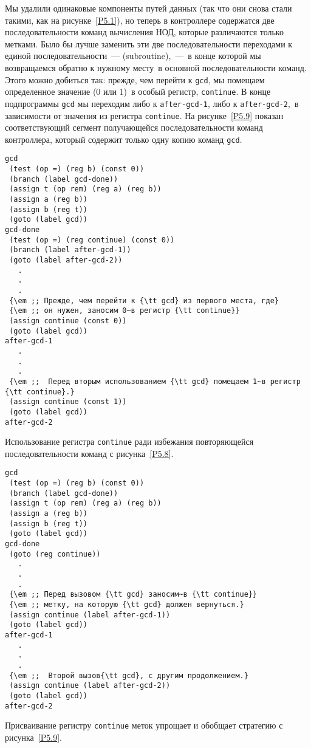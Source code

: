Мы удалили одинаковые компоненты путей данных (так что они
снова стали такими, как на рисунке~\ref{P5.1}), но теперь в
контроллере содержатся две последовательности команд вычисления НОД,
которые различаются только метками. Было бы лучше заменить эти две
последовательности переходами к единой последовательности~--- 
 (subroutine),~---~в конце которой мы
возвращаемся обратно к нужному месту~в основной последовательности
команд.  Этого можно добиться так: прежде, чем перейти к
{\tt gcd}, мы помещаем определенное значение (0 или 1)~в особый
регистр, {\tt continue}.
В конце подпрограммы {\tt gcd}
мы переходим либо к {\tt after-gcd-1}, либо к
{\tt after-gcd-2},~в зависимости от значения из регистра
{\tt continue}. На рисунке~\ref{P5.9} показан
соответствующий сегмент получающейся последовательности команд
контроллера, который содержит только одну копию команд
{\tt gcd}.


\begin{cntrfig}
\begin{Verbatim}[fontsize=\small]
gcd
 (test (op =) (reg b) (const 0))
 (branch (label gcd-done))
 (assign t (op rem) (reg a) (reg b))
 (assign a (reg b))
 (assign b (reg t))
 (goto (label gcd))
gcd-done
 (test (op =) (reg continue) (const 0))
 (branch (label after-gcd-1))
 (goto (label after-gcd-2))
   .
   .
   .
 {\em ;; Прежде, чем перейти к {\tt gcd} из первого места, где}
 {\em ;; он нужен, заносим 0~в регистр {\tt continue}}
 (assign continue (const 0))
 (goto (label gcd))
after-gcd-1
   .
   .
   .
 {\em ;;  Перед вторым использованием {\tt gcd} помещаем 1~в регистр {\tt continue}.}
 (assign continue (const 1))
 (goto (label gcd))
after-gcd-2
\end{Verbatim}
\caption{Использование регистра {\tt continue} ради избежания повторяющейся
последовательности команд с рисунка~\ref{P5.8}.}
\label{P5.9}
\end{cntrfig}


\begin{cntrfig}
\begin{Verbatim}[fontsize=\small]
gcd
 (test (op =) (reg b) (const 0))
 (branch (label gcd-done))
 (assign t (op rem) (reg a) (reg b))
 (assign a (reg b))
 (assign b (reg t))
 (goto (label gcd))
gcd-done
 (goto (reg continue))
   .
   .
   .
 {\em ;; Перед вызовом {\tt gcd} заносим~в {\tt continue}}
 {\em ;; метку, на которую {\tt gcd} должен вернуться.}
 (assign continue (label after-gcd-1))
 (goto (label gcd))
after-gcd-1
   .
   .
   .
 {\em ;;  Второй вызов{\tt gcd}, с другим продолжением.}
 (assign continue (label after-gcd-2))
 (goto (label gcd))
after-gcd-2
\end{Verbatim}
\caption{Присваивание регистру {\tt continue} меток упрощает и обобщает
стратегию с рисунка~\ref{P5.9}.}
\label{P5.10}

\end{cntrfig}

